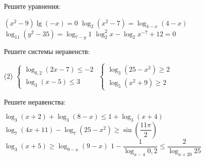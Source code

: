%
%

\begin{class}[number=1]
	\begin{listofex}
		\item Решите уравнения: %
		\begin{tasks}
			\task \((x^2-9)\lg(-x)=0  \)
			\task \( \log_2(x^2-7)=\log_{4-x}(4-x) \)
			\task \( \log_{11}(y^2-35)=\log_{7-y}1 \)
			\task \( \log_2^2x-\log_2x^{-7}+12=0 \)
		\end{tasks}
		\item Решите системы неравенств: %
		\begin{tasks}(2)
			\task \( \begin{cases} \log_{0,2}(2x-7) \le -2 \\ \log_3 (x-5) \le 3 \end{cases} \)
			\task \( \begin{cases} \log_3 (25-x^2) \ge 2 \\ \log_5 (x^2+9) \ge 2 \end{cases} \)
		\end{tasks}
		\item Решите неравенства: %
		\begin{tasks}
			\task \( \log_3(x+2)+\log_3(8-x)\le 1 + \log_3(x+4) \)
			\task \( \log_7(4x+11)-\log_7(25-x^2)\ge \sin \left( \dfrac{ 11\pi }{ 2 } \right) \)
			\task \( \log_3(x+5) \ge \log_{9-x}(9-x) \)
			\task \( 1-\dfrac{ 1 }{ \log_{x-4}0,2 } \le \dfrac{ 2 }{ \log_{x+20}25 } \)
		\end{tasks}
		
	\end{listofex}
\end{class}

